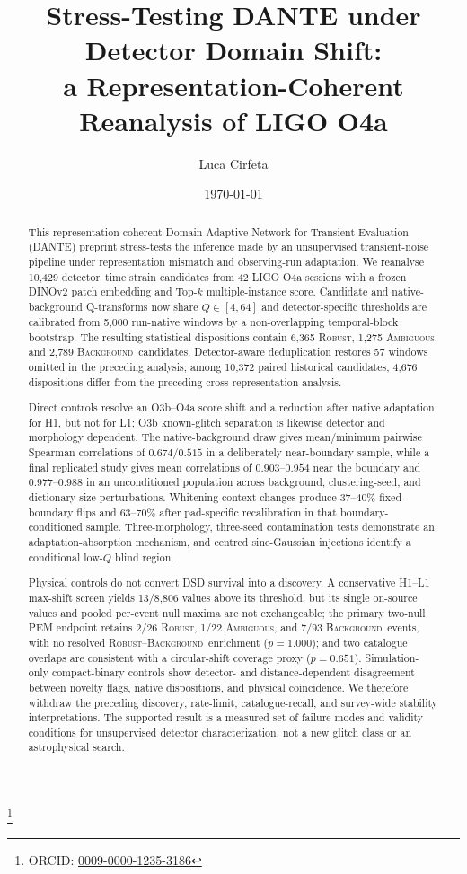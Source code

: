 \documentclass[aps,prd,twocolumn,superscriptaddress,nofootinbib,amsmath,amssymb,floatfix,10pt]{revtex4-2}
\newcommand{\robust}{\textsc{Robust}}
\newcommand{\ambiguous}{\textsc{Ambiguous}}
\newcommand{\background}{\textsc{Background}}
\begin{document}
\title{Stress-Testing DANTE under Detector Domain Shift:\\
a Representation-Coherent Reanalysis of LIGO O4a}

\author{Luca Cirfeta}
\thanks{ORCID: \href{https://orcid.org/0009-0000-1235-3186}{0009-0000-1235-3186}}
\date{\today}

\begin{abstract}
This representation-coherent Domain-Adaptive Network for Transient Evaluation
(DANTE) preprint stress-tests the inference made by an
unsupervised transient-noise pipeline under representation mismatch and
observing-run adaptation.  We reanalyse 10,429 detector--time strain candidates from 42 LIGO
O4a sessions with a frozen DINOv2 patch embedding and Top-$k$
multiple-instance score.  Candidate and native-background Q-transforms now
share $Q\in[4,64]$ and detector-specific thresholds are calibrated from 5,000
run-native windows by a non-overlapping temporal-block bootstrap.  The resulting statistical
dispositions contain 6,365 \robust, 1,275 \ambiguous, and 2,789 \background\
candidates. Detector-aware deduplication restores 57 windows omitted in the
preceding analysis;
among 10,372 paired historical candidates, 4,676 dispositions differ from the
preceding cross-representation analysis.

Direct controls resolve an O3b--O4a score shift and a reduction after native
adaptation for H1, but not for L1; O3b known-glitch separation is likewise
detector and morphology dependent.  The native-background draw gives
mean/minimum pairwise Spearman correlations of $0.674/0.515$ in a deliberately
near-boundary sample, while a final replicated study gives mean correlations
of $0.903$--$0.954$ near the boundary and $0.977$--$0.988$ in an
unconditioned population across background, clustering-seed, and dictionary-size
perturbations.
Whitening-context changes produce 37--40\% fixed-boundary flips and 63--70\%
after pad-specific recalibration in that boundary-conditioned sample.
Three-morphology, three-seed contamination tests demonstrate an
adaptation-absorption mechanism, and centred sine-Gaussian injections identify
a conditional low-$Q$ blind region.

Physical controls do not convert DSD survival into a discovery.  A conservative
H1--L1 max-shift screen yields 13/8,806 values above its threshold, but its
single on-source values and pooled per-event null maxima are not exchangeable;
the primary two-null PEM endpoint retains
2/26 \robust, 1/22 \ambiguous, and 7/93 \background\ events, with no resolved
\robust--\background\ enrichment ($p=1.000$); and two catalogue overlaps are
consistent with a circular-shift coverage proxy ($p=0.651$).
Simulation-only compact-binary controls show detector- and
distance-dependent disagreement between novelty flags, native dispositions,
and physical coincidence.  We therefore withdraw the preceding discovery, rate-limit,
catalogue-recall, and survey-wide stability interpretations.  The supported
result is a measured set of failure modes and validity conditions for
unsupervised detector characterization, not a new glitch class or an
astrophysical search.
\end{abstract}
\end{document}
